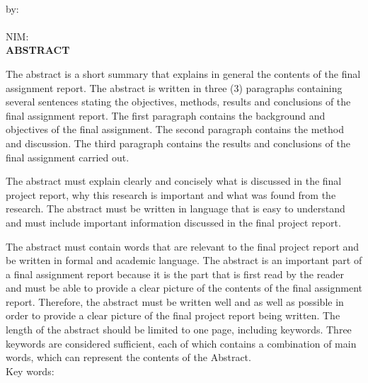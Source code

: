 
\clearpage
{}
{}
\begin{center}
    \textbf{\large{\judulen}}\\[0.5cm]
    by:\\
    \penulis\\
    NIM: \nim\\[2em]
    \textbf{ABSTRACT}\\[0.5cm]
\end{center}

The abstract is a short summary that explains in general the contents of the final assignment report. The abstract is written in three (3) paragraphs containing several sentences stating the objectives, methods, results and conclusions of the final assignment report. The first paragraph contains the background and objectives of the final assignment. The second paragraph contains the method and discussion. The third paragraph contains the results and conclusions of the final assignment carried out.

The abstract must explain clearly and concisely what is discussed in the final project report, why this research is important and what was found from the research. The abstract must be written in language that is easy to understand and must include important information discussed in the final project report.

The abstract must contain words that are relevant to the final project report and be written in formal and academic language. The abstract is an important part of a final assignment report because it is the part that is first read by the reader and must be able to provide a clear picture of the contents of the final assignment report. Therefore, the abstract must be written well and as well as possible in order to provide a clear picture of the final project report being written. The length of the abstract should be limited to one page, including keywords. Three keywords are considered sufficient, each of which contains a combination of main words, which can represent the contents of the Abstract.\\[0.6cm]

\noindent Key words: \keywords